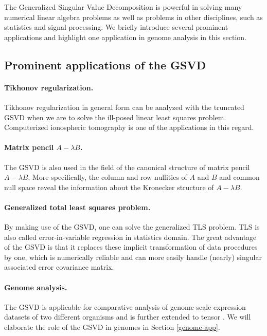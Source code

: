 The Generalized Singular Value Decomposition is powerful in solving many numerical linear algebra problems as well as problems in other disciplines, such as statistics and signal processing. We briefly introduce several prominent applications and highlight one application in genome analysis in this section.    

\subsection{Prominent applications of the GSVD}

\paragraph{Tikhonov regularization.}
Tikhonov regularization in general form can be analyzed with the truncated GSVD when we are to solve the ill-posed linear least squares problem. \cite{hansen1989regularization} \cite{dykes2014simplified} \cite{wei2016tikhonov} Computerized ionospheric tomography \cite{bhuyan2004application} is one of the applications in this regard. 

\paragraph{Matrix pencil $A - \lambda B$.}
The GSVD is also used in the field of the canonical structure of matrix pencil $A-\lambda B$. \cite{kaagstrom1984generalized} More specifically, the column and row nullities of $A$ and $B$ and common null space reveal the information about the Kronecker structure of $A-\lambda B$.

\paragraph{Generalized total least squares problem.}
By making use of the GSVD, one can solve the generalized TLS problem. TLS is also called error-in-variable regression in statistics domain. The great advantage of the GSVD is that it replaces these implicit transformation of data procedures by one, which is numerically reliable and can more easily handle (nearly) singular associated error covariance matrix. \cite{van1989analysis} \cite{bai1992csd}

\paragraph{Genome analysis.}
The GSVD is applicable for comparative analysis of genome-scale expression datasets of two different organisms \cite{alter2003generalized} and is further extended to tensor \cite{sankaranarayanan2015tensor}. We will elaborate the role of the GSVD in genomes in Section \ref{genome-app}.

